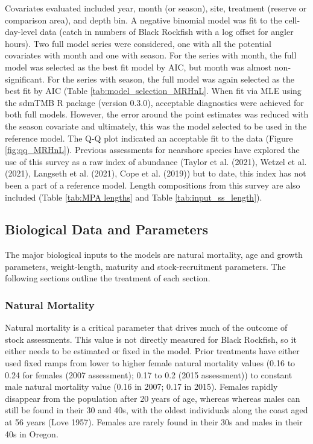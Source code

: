 \documentclass[11pt,
  letterpaper,
]{article}
\begin{document}
Covariates evaluated included year, month (or season), site, treatment (reserve or comparison area), and depth bin. A negative binomial model was fit to the cell-day-level data (catch in numbers of Black Rockfish with a log offset for angler hours). Two full model series were considered, one with all the potential covariates with month and one with season. For the series with month, the full model was selected as the best fit model by AIC, but month was almost non-significant. For the series with season, the full model was again selected as the best fit by AIC (Table \ref{tab:model_selection_MRHnL}. When fit via MLE using the sdmTMB R package (version 0.3.0), acceptable diagnostics were achieved for both full models. However, the error around the point estimates was reduced with the season covariate and ultimately, this was the model selected to be used in the reference model. The Q-Q plot indicated an acceptable fit to the data (Figure \ref{fig:qq_MRHnL}). Previous assessments for nearshore species have explored the use of this survey as a raw index of abundance (Taylor et al. (2021), Wetzel et al. (2021), Langseth et al. (2021), Cope et al. (2019)) but to date, this index has not been a part of a reference model. Length compositions from this survey are also included (Table \ref{tab:MPA lengths} and Table \ref{tab:input_ss_length}).

\hypertarget{biological-data-and-parameters}{%
\subsection{Biological Data and Parameters}\label{biological-data-and-parameters}}

The major biological inputs to the models are natural mortality, age and growth parameters, weight-length, maturity and stock-recruitment parameters. The following sections outline the treatment of each section.

\hypertarget{natural-mortality}{%
\subsubsection{Natural Mortality}\label{natural-mortality}}

Natural mortality is a critical parameter that drives much of the outcome of stock assessments. This value is not directly measured for Black Rockfish, so it either needs to be estimated or fixed in the model. Prior treatments have either used fixed ramps from lower to higher female natural mortality values (0.16 to 0.24 for females (2007 assessment); 0.17 to 0.2 (2015 assessment)) to constant male natural mortality value (0.16 in 2007; 0.17 in 2015). Females rapidly disappear from the population after 20 years of age, whereas whereas males can still be found in their 30 and 40s, with the oldest individuals along the coast aged at 56 years (Love 1957). Females are rarely found in their 30s and males in their 40s in Oregon.
\end{document}
